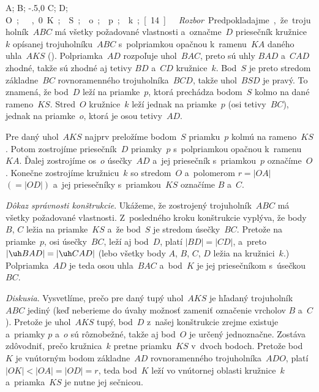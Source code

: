 {%
\fontplace
\lBpoint A; \trpoint B; \tlpoint\xy-.5,0 C;
\trpoint D; \rpoint\down\unit O;
\tpoint{},0 K; \rbpoint S;
\bpoint o; \lpoint p; \rBpoint k;
[14] \hfil\Obr

{\it Rozbor\/}. Predpokladajme, že trojuholník~$ABC$ má všetky požadované
vlastnosti a~označme~$D$ priesečník kružnice~$k$ opísanej trojuholníku~$ABC$
s~polpriamkou opačnou k~ramenu~$KA$ daného uhla~$AKS$ (\obr).
Polpriamka~$AD$ rozpoľuje uhol~$BAC$, preto sú uhly $BAD$ a~$CAD$
zhodné, takže sú zhodné aj tetivy $BD$ a~$CD$ kružnice~$k$. Bod~$S$
je preto stredom základne~$BC$ rovnoramenného trojuholníka~$BCD$,
takže uhol~$BSD$ je pravý. To znamená, že bod~$D$ leží na
priamke~$p$, ktorá prechádza bodom~$S$ kolmo na dané rameno~$KS$.
Stred~$O$ kružnice~$k$ leží jednak na priamke~$p$ (osi tetivy~$BC$),
jednak na priamke~$o$, ktorá je osou tetivy~$AD$.
\inspicture{}

\konstrukcia
Pre daný uhol~$AKS$ najprv preložíme bodom~$S$ priamku~$p$ kolmú
na rameno~$KS$. Potom zostrojíme priesečník~$D$ priamky~$p$
s~polpriamkou opačnou k~ramenu~$KA$. Ďalej zostrojíme os~$o$
úsečky~$AD$ a~jej priesečník s~priamkou~$p$ označíme~$O$. Konečne
zostrojíme kružnicu~$k$ so stredom~$O$ a~polomerom $r=|OA|$
$(=|OD|)$ a~jej priesečníky s~priamkou~$KS$ označíme $B$ a~$C$.

\smallskip
{\it Dôkaz správnosti konštrukcie\/}.
Ukážeme, že zostrojený trojuholník~$ABC$ má všetky požadované
vlastnosti. Z~posledného kroku konštrukcie vyplýva, že body $B$, $C$
ležia na priamke~$KS$ a~že bod~$S$ je stredom úsečky~$BC$. Pretože
na priamke~$p$, osi úsečky~$BC$, leží aj bod~$D$, platí
$|BD|=|CD|$, a~preto $|\uh BAD|=|\uh CAD|$ (lebo všetky
body $A$, $B$, $C$, $D$ ležia na kružnici~$k$.) Polpriamka~$AD$ je
teda osou uhla~$BAC$ a~bod~$K$ je jej priesečníkom s~úsečkou~$BC$.

\smallskip
{\it Diskusia\/}.
Vysvetlíme, prečo pre daný tupý uhol~$AKS$ je hľadaný trojuholník~$ABC$
jediný (keď neberieme do úvahy možnosť zameniť označenie vrcholov $B$
a~$C$). Pretože je uhol~$AKS$ tupý, bod~$D$ z~našej konštrukcie
zrejme existuje a~priamky $p$ a~$o$ sú rôznobežné, takže
aj bod~$O$ je určený jednoznačne. Zostáva zdôvodniť, prečo
kružnica~$k$ pretne priamku~$KS$ v~dvoch bodoch. Pretože bod~$K$
je vnútorným bodom základne~$AD$ rovnoramenného trojuholníka~$ADO$, platí
$|OK|<|OA|=|OD|=r$, teda bod~$K$ leží vo vnútornej oblasti
kružnice~$k$ a~priamka~$KS$ je nutne jej sečnicou.}


